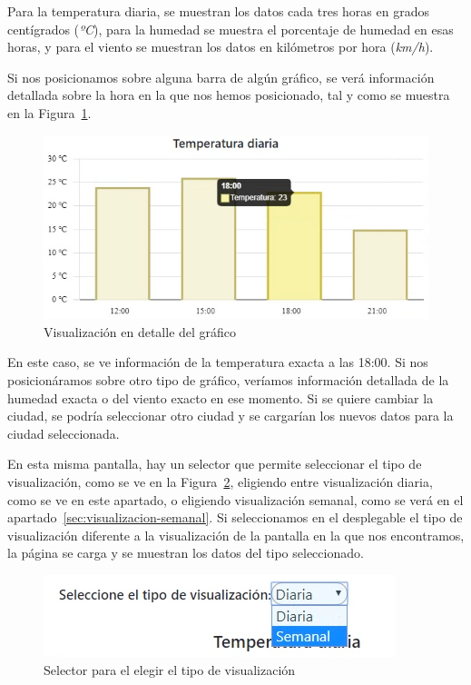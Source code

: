 \documentclass[a4paper, 12pt]{book}
\begin{document}
\vspace{5mm}
Para la temperatura diaria, se muestran los datos cada tres horas en grados centígrados (\textit{ºC}), para la humedad se muestra el porcentaje de humedad en esas horas, y para el viento se muestran los datos en kilómetros por hora (\textit{km/h}).

\vspace{5mm}
Si nos posicionamos sobre alguna barra de algún gráfico, se verá información detallada sobre la hora en la que nos hemos posicionado, tal y como se muestra en la Figura~\ref{fig:detalle_chart}.
\begin{figure}[h]
  \centering
  \includegraphics{img_usadas/detalle_chart.png}
  \caption{Visualización en detalle del gráfico}
  \label{fig:detalle_chart}
\end{figure}

En este caso, se ve información de la temperatura exacta a las 18:00. Si nos posicionáramos sobre otro tipo de gráfico, veríamos información detallada de la humedad exacta o del viento exacto en ese momento.
Si se quiere cambiar la ciudad, se podría seleccionar otro ciudad y se cargarían los nuevos datos para la ciudad seleccionada.

\vspace{5mm}
En esta misma pantalla, hay un selector que permite seleccionar el tipo de visualización, como se ve en la Figura~\ref{fig:seleccion_tipo}, eligiendo entre visualización diaria, como se ve en este apartado, o eligiendo visualización semanal, como se verá en el apartado~\ref{sec:visualizacion-semanal}.
Si seleccionamos en el desplegable el tipo de visualización diferente a la visualización de la pantalla en la que nos encontramos, la página se carga y se muestran los datos del tipo seleccionado.
\begin{figure}[h]
  \centering
  \includegraphics{img_usadas/seleccion_tipo.png}
  \caption{Selector para el elegir el tipo de visualización}
  \label{fig:seleccion_tipo}
\end{figure}
\end{document}

